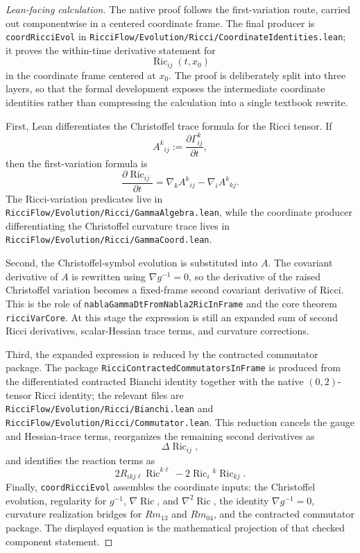\documentclass[11pt]{article}
\theoremstyle{plain}
\theoremstyle{definition}
\theoremstyle{remark}
\newcommand{\Ric}{\operatorname{Ric}}
\newcommand{\leanref}[1]{\nolinkurl{#1}}
\newcommand{\leanfile}[1]{\nolinkurl{#1}}
\newcommand{\rffile}[1]{\leanfile{#1}}
\begin{document}
\begin{proof}[Lean-facing calculation]
The native proof follows the first-variation route, carried out componentwise
in a centered coordinate frame.  The final producer is
\leanref{coordRicciEvol} in
\rffile{RicciFlow/Evolution/Ricci/CoordinateIdentities.lean}; it proves the
within-time derivative statement for
\[
  \Ric_{ij}(t,x_0)
\]
in the coordinate frame centered at \(x_0\).  The proof is deliberately split
into three layers, so that the formal development exposes the intermediate
coordinate identities rather than compressing the calculation into a single
textbook rewrite.

First, Lean differentiates the Christoffel trace formula for the Ricci tensor.
If
\[
  A^k{}_{ij}:=\frac{\partial\Gamma^k_{ij}}{\partial t},
\]
then the first-variation formula is
\[
  \frac{\partial\Ric_{ij}}{\partial t}
  =
  \nabla_k A^k{}_{ij}-\nabla_i A^k{}_{kj}.
\]
The Ricci-variation predicates live in
\rffile{RicciFlow/Evolution/Ricci/GammaAlgebra.lean}, while the coordinate
producer differentiating the Christoffel curvature trace lives in
\rffile{RicciFlow/Evolution/Ricci/GammaCoord.lean}.

Second, the Christoffel-symbol evolution is substituted into \(A\).  The
covariant derivative of \(A\) is rewritten using \(\nabla g^{-1}=0\), so the
derivative of the raised Christoffel variation becomes a fixed-frame second
covariant derivative of Ricci.  This is the role of
\leanref{nablaGammaDtFromNabla2RicInFrame} and the core theorem
\leanref{ricciVarCore}.  At this stage the expression is still an expanded sum
of second Ricci derivatives, scalar-Hessian trace terms, and curvature
corrections.

Third, the expanded expression is reduced by the contracted commutator package.
The package \leanref{RicciContractedCommutatorsInFrame} is produced from the
differentiated contracted Bianchi identity together with the native
\((0,2)\)-tensor Ricci identity; the relevant files are
\rffile{RicciFlow/Evolution/Ricci/Bianchi.lean} and
\rffile{RicciFlow/Evolution/Ricci/Commutator.lean}.  This reduction cancels the
gauge and Hessian-trace terms, reorganizes the remaining second derivatives as
\[
  \Delta\Ric_{ij},
\]
and identifies the reaction terms as
\[
  2R_{ikj\ell}\Ric^{k\ell}-2\Ric_i{}^k\Ric_{kj}.
\]
Finally, \leanref{coordRicciEvol} assembles the coordinate inputs: the
Christoffel evolution, regularity for \(g^{-1}\), \(\nabla\Ric\), and
\(\nabla^2\Ric\), the identity \(\nabla g^{-1}=0\), curvature realization
bridges for \(Rm_{13}\) and \(Rm_{04}\), and the contracted commutator package.
The displayed equation is the mathematical projection of that checked component
statement.
\end{proof}
\end{document}
